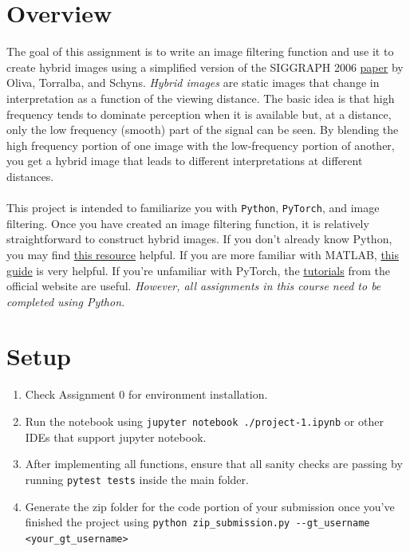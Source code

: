 \documentclass{article}
\begin{document}
\section*{Overview}
The goal of this assignment is to write an image filtering function and use it to create hybrid images using a simplified version of the SIGGRAPH 2006 \href{http://olivalab.mit.edu/publications/OlivaTorralb_Hybrid_Siggraph06.pdf}{paper} by Oliva, Torralba, and Schyns. \textit{Hybrid images} are static images that change in interpretation as a function of the viewing distance. The basic idea is that high frequency tends to dominate perception when it is available but, at a distance, only the low frequency (smooth) part of the signal can be seen. By blending the high frequency portion of one image with the low-frequency portion of another, you get a hybrid image that leads to different interpretations at different distances.
\\
\\
This project is intended to familiarize you with \lstinline{Python}, \lstinline{PyTorch}, and image filtering. Once you have created an image filtering function, it is relatively straightforward to construct hybrid images. If you don't already know Python, you may find \href{https://docs.python.org/3/tutorial/}{this resource} helpful. If you are more familiar with MATLAB, \href{http://mathesaurus.sourceforge.net/matlab-numpy.html}{this guide} is very helpful. If you're unfamiliar with PyTorch, the \href{https://pytorch.org/tutorials/}{tutorials} from the official website are useful. \textit{However, all assignments in this course need to be completed using Python.}


\section*{Setup}
\begin{enumerate}
    \item Check Assignment 0 for environment installation.
    \item Run the notebook using \lstinline{jupyter notebook ./project-1.ipynb} or other IDEs that support jupyter notebook.
    \item After implementing all functions, ensure that all sanity checks are passing by running \lstinline{pytest tests} inside the main folder.
    \item Generate the zip folder for the code portion of your submission once you've finished the project using \lstinline{python zip_submission.py --gt_username <your_gt_username>}
\end{enumerate}
\end{document}

